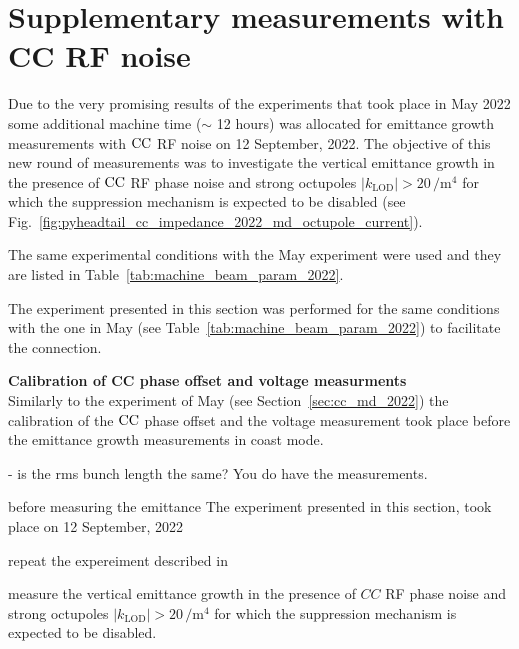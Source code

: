 

\section{Supplementary measurements with CC RF noise}\label{sec:cc_md_Sep2022}
Due to the very promising results of the experiments that took place in May 2022 some additional machine time ($\sim$ 12 hours) was allocated for emittance growth measurements with ${\mathrm{CC}}$ RF noise on 12 September, 2022. The objective of this new round of measurements was to investigate the vertical emittance growth in the presence of ${\mathrm{CC}}$ RF phase noise and strong octupoles $|k_\mathrm{LOD} | > 20$\,$\mathrm{/m^4}$ for which the suppression mechanism is expected to be disabled (see Fig.~\ref{fig:pyheadtail_cc_impedance_2022_md_octupole_current}).

The same experimental conditions with the May experiment were used and they are listed in Table~\ref{tab:machine_beam_param_2022}. 



The experiment presented in this section was performed for the same conditions with the one in May (see Table~\ref{tab:machine_beam_param_2022}) to facilitate the connection.

\textbf{Calibration of CC phase offset and voltage measurments}\\
Similarly to the experiment of May (see Section~\ref{sec:cc_md_2022}) the calibration of the ${\mathrm{CC}}$ phase offset and the voltage measurement took place before the emittance growth measurements in coast mode.


- is the rms bunch length the same? You do have the measurements.

before measuring the emittance 
The experiment presented in this section, took place on 12 September, 2022 


repeat the expereiment described in 

measure the vertical emittance growth in the presence of $CC$ RF phase noise and strong octupoles $|k_\mathrm{LOD} | > 20$\,$\mathrm{/m^4}$ for which the suppression mechanism is expected to be disabled.


